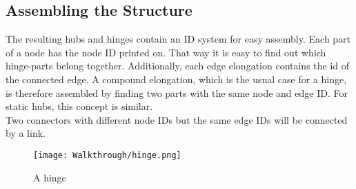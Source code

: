 \subsection{Assembling the Structure}
The resulting hubs and hinges contain an ID system for easy assembly. Each part of a node has the node ID printed on. That way it is easy to find out which hinge-parts belong together. Additionally, each edge elongation contains the id of the connected edge. A compound elongation, which is the usual case for a hinge, is therefore assembled by finding two parts with the same node and edge ID. For static hubs, this concept is similar.\\
Two connectors with different node IDs but the same edge IDs will be connected by a link.
\begin{figure}[ht!]
    \texttt{[image: Walkthrough/hinge.png]}
    \centering
    \caption{A hinge}
    \label{fig:hinge}
\end{figure}
